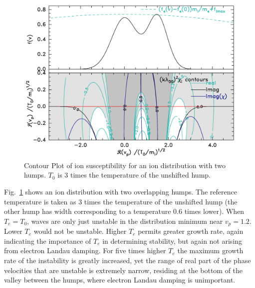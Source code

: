 \documentclass[12pt]{article}
\begin{document}
\begin{figure}[htp]
  \center\includegraphics[width=.7\hsize]{twogaussLowTe}\endcenter
  \caption{Contour Plot of ion susceptibility for an ion distribution
    with two humps. $T_0$ is 3 times the temperature of the unshifted
    hump. \label{twogausslowTe}}
\end{figure}
Fig.\ \ref{twogausslowTe} shows an ion distribution with two
overlapping humps.
The reference temperature is taken as 3 times the temperature of the
unshifted hump (the other hump has width corresponding to a
temperature 0.6 times lower). When $T_e=T_0$, waves are only just
unstable in the distribution minimum near $v_p=1.2$. Lower $T_e$ would
not be unstable. Higher $T_e$ permits greater growth rate, again
indicating the importance of $T_e$ in determining stability, but again
not arising from electron Landau damping. For
five times higher $T_e$ the maximum growth rate of the instability is greatly
increased, yet the range of real part of the phase
velocities that are unstable is extremely narrow, residing at the
bottom of the valley between the humps, where electron Landau damping
is unimportant. 
\end{document}
